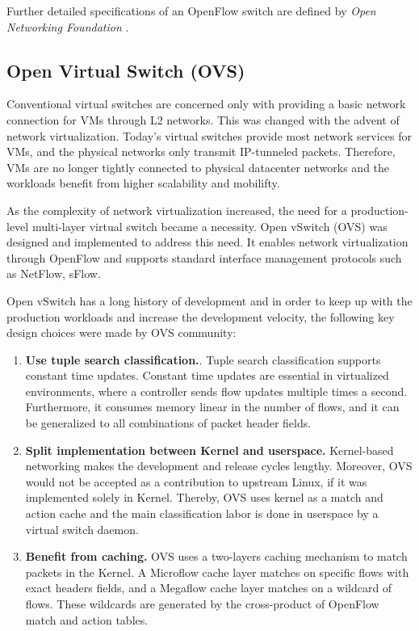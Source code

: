 Further detailed specifications of an OpenFlow switch are defined by 
\emph{Open Networking Foundation} \cite{specification2009version}. 





\subsection{Open Virtual Switch (OVS)}
\label{OVS}
Conventional virtual switches are concerned only with providing a basic network connection for VMs through L2 networks. This was changed with the advent of network virtualization. Today's virtual switches provide most network services for VMs, and the physical networks only transmit IP-tunneled packets. Therefore, VMs are no longer tightly connected to physical datacenter networks and the workloads benefit from higher scalability and mobilifty.

As the complexity of network virtualization increased, the need for a production-level multi-layer virtual switch became a necessity. Open vSwitch (OVS) was designed and implemented to address this need. It enables network virtualization through OpenFlow and supports standard interface management protocols such as NetFlow\cite{claise2004cisco}, sFlow\cite{wang2004sflow}.

Open vSwitch has a long history of development and in order to keep up with the production workloads and increase the development velocity,
the following key design choices were made by OVS community:
\begin{enumerate}
    \item \textbf{Use tuple search classification.}.  Tuple search classification supports constant time updates. Constant time updates are essential in virtualized environments, where a controller sends flow updates multiple times a second. Furthermore, it consumes memory linear in the number of flows, and it can be generalized to all combinations of packet header fields.
    \item \textbf{Split implementation between Kernel and userspace.} Kernel-based networking makes the development and release cycles lengthy. Moreover, OVS would not be accepted as a contribution to upstream Linux, if it was implemented solely in Kernel. Thereby, OVS uses kernel as a match and action cache and the main classification labor is done in userspace by a virtual switch daemon.
    \item \textbf{Benefit from caching.} OVS uses a two-layers caching mechanism to match packets in the Kernel. A Microflow cache layer matches on specific flows with exact headers fields, and a Megaflow cache layer matches on a wildcard of flows. These wildcards are generated by the cross-product of OpenFlow match and action tables.
\end{enumerate}

